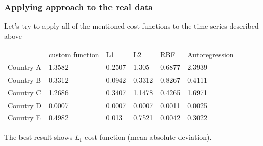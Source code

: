 \documentclass[intlimits, 9pt, unicode]{beamer}
\begin{document}
\begin{frame}
    \frametitle{Applying approach to the real data}
	
	Let's try to apply all of the mentioned cost functions to the time series described above
	\begin{table}[]
\begin{tabular}{llllll}
          & custom function & L1     & L2     & RBF    & Autoregression \\
Country A & 1.3582          & 0.2507 & 1.305  & 0.6877 & 2.3939         \\
Country B & 0.3312          & 0.0942 & 0.3312 & 0.8267 & 0.4111         \\
Country C & 1.2686          & 0.3407 & 1.1478 & 0.4265 & 1.6971         \\
Country D & 0.0007          & 0.0007 & 0.0007 & 0.0011 & 0.0025         \\
Country E & 0.4982          & 0.013  & 0.7521 & 0.0042 & 0.3022        
\end{tabular}
\end{table}

The best result shows $L_1$ cost function (mean absolute deviation).
	
\end{frame}
\end{document}

